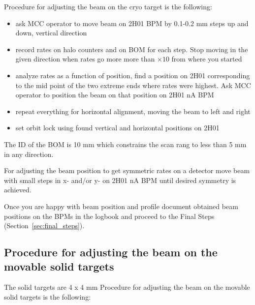 Procedure for adjusting the beam on the cryo target is the following:
\begin{itemize}
\item ask MCC operator to move beam on 2H01 BPM by 0.1-0.2 mm steps up and down, vertical direction
\item record rates on halo counters and on BOM for each step. Stop moving in the given direction when rates go more more than $\times 10$ from where you started 
\item analyze rates as a function of position, find a position on 2H01 corresponding to the mid point of the two extreme ends where rates were highest. Ask MCC operator to position the beam on that position on 2H01 nA BPM
\item  repeat everything for horizontal alignment, moving the beam to left and right 
\item set orbit lock using found vertical and horizontal positions on 2H01 
\end{itemize}

The ID of the BOM is 10 mm which constrains the scan rang to less than 5 mm in any direction.

For adjusting the beam position to get symmetric rates on a detector move beam with small steps in x- and/or y- on 2H01 nA BPM until desired symmetry is achieved.  

\vspace{1.cm}

Once you are happy with beam position and profile document obtained beam positions on the BPMs in the logbook and proceed to the Final Steps (Section~\ref{sec:final_steps}).

\subsection{Procedure for adjusting the beam on the movable solid targets} 

The solid targets are 4 x 4 mm
Procedure for adjusting the beam on the movable solid targets is the following:


